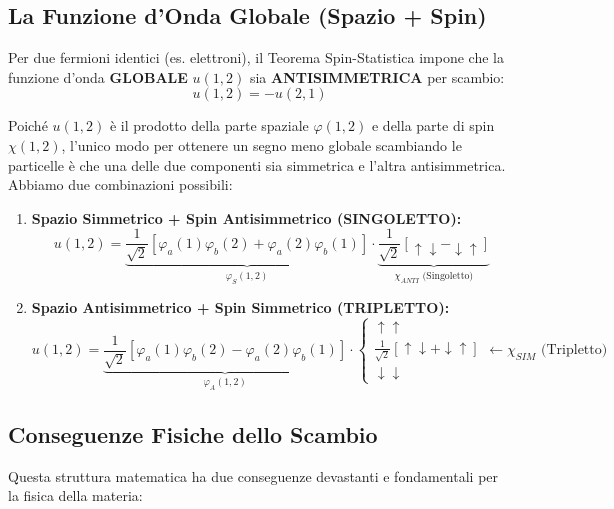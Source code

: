 \documentclass[11pt, a4paper]{article}
\begin{document}
\subsection{La Funzione d'Onda Globale (Spazio + Spin)} %

Per due fermioni identici (es. elettroni), il Teorema Spin-Statistica impone che la funzione d'onda \textbf{GLOBALE} $u(1,2)$ sia \textbf{ANTISIMMETRICA} per scambio: %
\begin{equation}
    u(1,2) = -u(2,1) %
\end{equation}

\noindent
Poiché $u(1,2)$ è il prodotto della parte spaziale $\varphi(1,2)$ e della parte di spin $\chi(1,2)$, l'unico modo per ottenere un segno meno globale scambiando le particelle è che una delle due componenti sia simmetrica e l'altra antisimmetrica. Abbiamo due combinazioni possibili: %

\begin{enumerate}
    \item \textbf{Spazio Simmetrico + Spin Antisimmetrico (SINGOLETTO):} %
    \begin{equation}
        u(1,2) = \underbrace{ \frac{1}{\sqrt{2}} [\varphi_a(1)\varphi_b(2) + \varphi_a(2)\varphi_b(1)] }_{\varphi_S(1,2)} \cdot \underbrace{ \frac{1}{\sqrt{2}} [\uparrow\downarrow - \downarrow\uparrow] }_{\chi_{ANTI} \text{ (Singoletto)}} %
    \end{equation}
    
    \item \textbf{Spazio Antisimmetrico + Spin Simmetrico (TRIPLETTO):} %
    \begin{equation}
        u(1,2) = \underbrace{ \frac{1}{\sqrt{2}} [\varphi_a(1)\varphi_b(2) - \varphi_a(2)\varphi_b(1)] }_{\varphi_A(1,2)} \cdot \begin{cases} \uparrow\uparrow \\ \frac{1}{\sqrt{2}}[\uparrow\downarrow + \downarrow\uparrow] \\ \downarrow\downarrow \end{cases} \leftarrow \chi_{SIM} \text{ (Tripletto)} %
    \end{equation}
\end{enumerate}

\subsection{Conseguenze Fisiche dello Scambio} %

Questa struttura matematica ha due conseguenze devastanti e fondamentali per la fisica della materia: %
\end{document}

